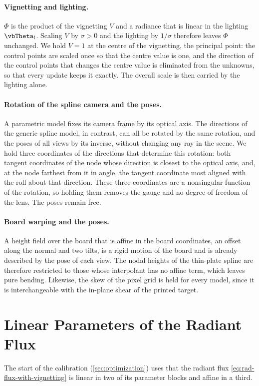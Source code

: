 \paragraph{Vignetting and lighting.} $\Phi$ is the product of the
vignetting $V$ and a radiance that is linear in the lighting
$\vbTheta_l$. Scaling $V$ by $\sigma>0$ and the lighting by
$1/\sigma$ therefore leaves $\Phi$ unchanged. We hold $V=1$ at the
centre of the vignetting, the principal point: the control points are scaled once so that
the centre value is one, and the direction of the control points that
changes the centre value is eliminated from the unknowns, so that
every update keeps it exactly. The overall scale is then carried by
the lighting alone.

\paragraph{Rotation of the spline camera and the poses.} A parametric
model fixes its camera frame by its optical axis. The directions of
the generic spline model, in contrast, can all be rotated by the same
rotation, and the poses of all views by its inverse, without changing
any ray in the scene. We hold three coordinates of the directions that
determine this rotation: both tangent coordinates of the node whose
direction is closest to the optical axis, and, at the node farthest
from it in angle, the tangent coordinate most aligned with the roll
about that direction. These three coordinates are a nonsingular
function of the rotation, so holding them removes the gauge and no
degree of freedom of the lens. The poses remain free.

\paragraph{Board warping and the poses.} A height field over the board
that is affine in the board coordinates, \ie an offset along the
normal and two tilts, is a rigid motion of the board and is already
described by the pose of each view. The nodal heights of the
thin-plate spline are therefore restricted to those whose interpolant
has no affine term, which leaves pure bending. Likewise, the skew of
the pixel grid is held for every model, since it is interchangeable
with the in-plane shear of the printed target.


\section{Linear Parameters of the Radiant Flux}
\label{sec:supp-linear}
The start of the calibration (\cref{sec:optimization}) uses that the
radiant flux \cref{eq:rad-flux-with-vignetting} is linear in two of
its parameter blocks and affine in a third.

